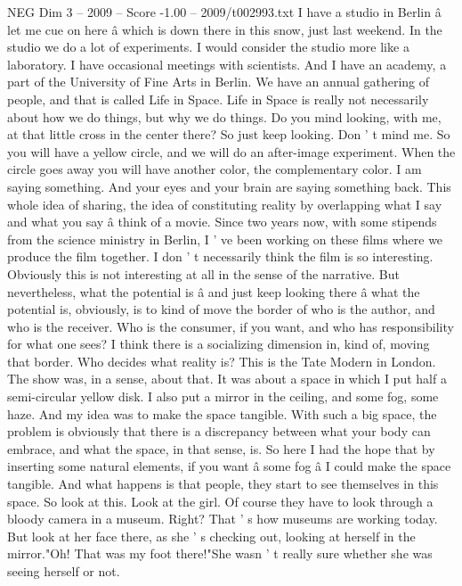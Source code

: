 \begin{textsample}{NEG Dim 3 – 2009 – Score -1.00 – 2009/t002993.txt}  \label{ex:f3_neg_030}
I have a studio in Berlin â let me cue on here â which is down there in this snow, just last weekend.
In the studio we do a lot of experiments.
I would consider the studio more like a laboratory.
I have occasional meetings with scientists.
And I have an academy, a part of the University of Fine Arts in Berlin.
We have an annual gathering of people, and that is called Life in Space.
Life in Space is really not necessarily about how we do things, but why we do things.
Do you mind looking, with me, at that little cross in the center there?
So just keep looking.
Don ' t mind me.
So you will have a yellow circle, and we will do an after-image experiment.
When the circle goes away you will have another color, the complementary color.
I am saying something.
And your eyes and your brain are saying something back.
This whole idea of sharing, the idea of constituting reality by overlapping what I say and what you say â think of a movie.
Since two years now, with some stipends from the science ministry in Berlin, I ' ve been working on these films where we produce the film together.
I don ' t necessarily think the film is so interesting.
Obviously this is not interesting at all in the sense of the narrative.
But nevertheless, what the potential is â and just keep looking there â what the potential is, obviously, is to kind of move the border of who is the author, and who is the receiver.
Who is the consumer, if you want, and who has responsibility for what one sees?
I think there is a socializing dimension in, kind of, moving that border.
Who decides what reality is?
This is the Tate Modern in London.
The show was, in a sense, about that.
It was about a space in which I put half a semi-circular yellow disk.
I also put a mirror in the ceiling, and some fog, some haze.
And my idea was to make the space tangible.
With such a big space, the problem is obviously that there is a discrepancy between what your body can embrace, and what the space, in that sense, is.
So here I had the hope that by inserting some natural elements, if you want â some fog â I could make the space tangible.
And what happens is that people, they start to see themselves in this space.
So look at this.
Look at the girl.
Of course they have to look through a bloody camera in a museum.
Right?
That ' s how museums are working today.
But look at her face there, as she ' s checking out, looking at herself in the mirror."Oh!
That was my foot there!"She wasn ' t really sure whether she was seeing herself or not.

\end{textsample}
